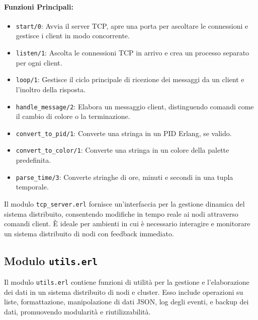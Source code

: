 \documentclass[12pt, a4paper]{report}
\begin{document}
\paragraph{Funzioni Principali:}
\begin{itemize}
    \item \texttt{start/0}: Avvia il server TCP, apre una porta per ascoltare le connessioni e gestisce i client in modo concorrente.
    \item \texttt{listen/1}: Ascolta le connessioni TCP in arrivo e crea un processo separato per ogni client.
    \item \texttt{loop/1}: Gestisce il ciclo principale di ricezione dei messaggi da un client e l'inoltro della risposta.
    \item \texttt{handle\_message/2}: Elabora un messaggio client, distinguendo comandi come il cambio di colore o la terminazione.
    \item \texttt{convert\_to\_pid/1}: Converte una stringa in un PID Erlang, se valido.
    \item \texttt{convert\_to\_color/1}: Converte una stringa in un colore della palette predefinita.
    \item \texttt{parse\_time/3}: Converte stringhe di ore, minuti e secondi in una tupla temporale.
\end{itemize}

\noindent
Il modulo \texttt{tcp\_server.erl} fornisce un'interfaccia per la gestione dinamica del sistema distribuito, consentendo modifiche in tempo reale ai nodi attraverso comandi client. È ideale per ambienti in cui è necessario interagire e monitorare un sistema distribuito di nodi con feedback immediato.

\subsection{Modulo \texttt{utils.erl}}

Il modulo \texttt{utils.erl} contiene funzioni di utilità per la gestione e l'elaborazione dei dati in un sistema distribuito di nodi e cluster. Esso include operazioni su liste, formattazione, manipolazione di dati JSON, log degli eventi, e backup dei dati, promuovendo modularità e riutilizzabilità.
\end{document}
